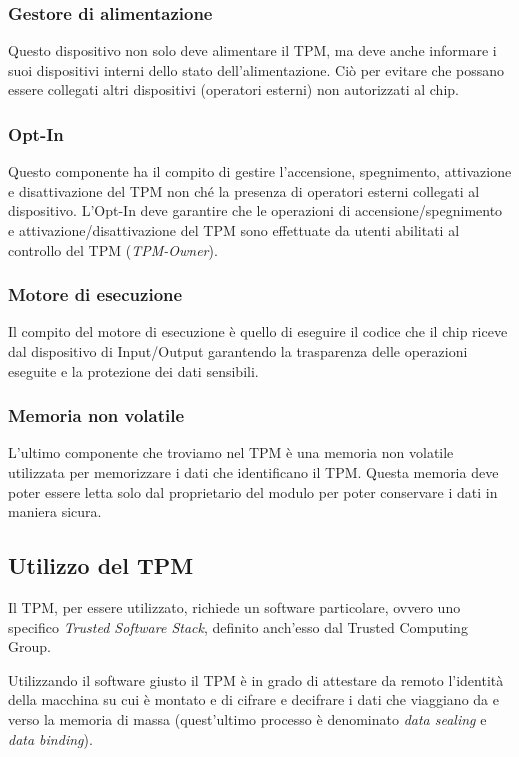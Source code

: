 \subsubsection{Gestore di alimentazione}
Questo dispositivo non solo deve alimentare il TPM, ma deve anche informare i suoi dispositivi interni dello stato dell'alimentazione. Ciò per evitare che possano essere collegati altri dispositivi (operatori esterni) non autorizzati al chip.

\subsubsection{Opt-In}
Questo componente ha il compito di gestire l'accensione, spegnimento, attivazione e disattivazione del TPM non ché la presenza di operatori esterni collegati al dispositivo. L'Opt-In deve garantire che le operazioni di accensione/spegnimento e attivazione/disattivazione del TPM sono effettuate da utenti abilitati al controllo del TPM (\textit{TPM-Owner}).

\subsubsection{Motore di esecuzione}
Il compito del motore di esecuzione è quello di eseguire il codice che il chip riceve dal dispositivo di Input/Output garantendo la trasparenza delle operazioni eseguite e la protezione dei dati sensibili.

\subsubsection{Memoria non volatile}
L'ultimo componente che troviamo nel TPM è una memoria non volatile utilizzata per memorizzare i dati che identificano il TPM. Questa memoria deve poter essere letta solo dal proprietario del modulo per poter conservare i dati in maniera sicura.

\subsection{Utilizzo del TPM}
Il TPM, per essere utilizzato, richiede un software particolare, ovvero uno specifico \textit{Trusted Software Stack}, definito anch'esso dal Trusted Computing Group.

Utilizzando il software giusto il TPM è in grado di attestare da remoto l'identità della macchina su cui è montato e di cifrare e decifrare i dati che viaggiano da e verso la memoria di massa (quest'ultimo processo è denominato \textit{data sealing} e \textit{data binding}).

